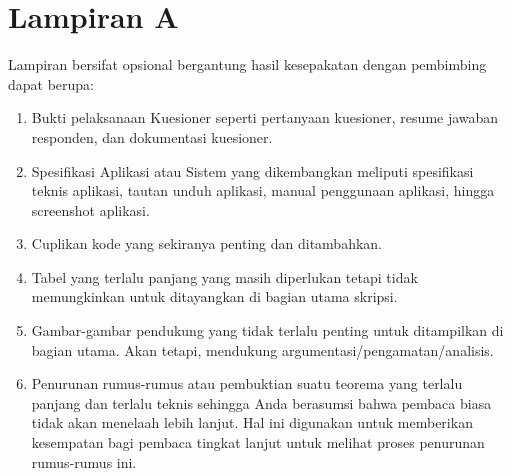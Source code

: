 \chapter*{Lampiran A}

Lampiran bersifat opsional bergantung hasil kesepakatan dengan pembimbing 
dapat berupa:

\begin{enumerate}
\item Bukti pelaksanaan Kuesioner seperti pertanyaan kuesioner, resume jawaban 
responden, dan dokumentasi kuesioner. 
\item Spesifikasi Aplikasi atau Sistem yang dikembangkan meliputi spesifikasi 
teknis aplikasi, tautan unduh aplikasi, manual penggunaan aplikasi, hingga 
screenshot aplikasi. 
\item Cuplikan kode yang sekiranya penting dan ditambahkan. 
\item Tabel yang terlalu panjang yang masih diperlukan tetapi tidak 
memungkinkan untuk ditayangkan di bagian utama skripsi.
\item Gambar-gambar pendukung yang tidak terlalu penting untuk ditampilkan di 
bagian utama. Akan tetapi, mendukung argumentasi/pengamatan/analisis.
\item Penurunan rumus-rumus atau pembuktian suatu teorema yang terlalu 
panjang dan terlalu teknis sehingga Anda berasumsi bahwa pembaca biasa 
tidak akan menelaah lebih lanjut. Hal ini digunakan untuk memberikan 
kesempatan bagi pembaca tingkat lanjut untuk melihat proses penurunan 
rumus-rumus ini.
\end{enumerate}